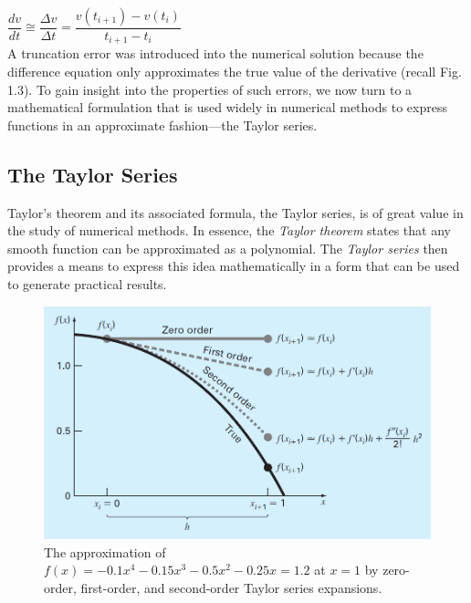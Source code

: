 \documentclass[../main.tex]{subfiles}
\begin{document}
$\dfrac{dv}{dt} \cong \dfrac{\Delta v}{\Delta t} = \dfrac{v(t_{i+1})-v(t_i)}{t_{i+1}-t_i}$\\

\noindent
A truncation error was introduced into the numerical solution because the difference equation
only approximates the true value of the derivative (recall Fig. 1.3). To gain insight into
the properties of such errors, we now turn to a mathematical formulation that is used widely
in numerical methods to express functions in an approximate fashion---the Taylor series.\\
\newpage

\subsection{The Taylor Series}
\noindent
Taylor's theorem and its associated formula, the Taylor series, is of great value in the study
of numerical methods. In essence, the \emph{Taylor theorem} states that any smooth function can
be approximated as a polynomial. The \emph{Taylor series} then provides a means to express this
idea mathematically in a form that can be used to generate practical results.\\
\bigskip

\begin{figure}[h]
    \includegraphics[width=0.8\linewidth]{./images/fig_4_7}
    \caption{The approximation of $f(x)=-0.1x^4 - 0.15x^3 - 0.5x^2 - 0.25x =1.2$ at $x = 1$ by
    zero-order, first-order, and second-order Taylor series expansions.}
\end{figure}
\bigskip
\end{document}
